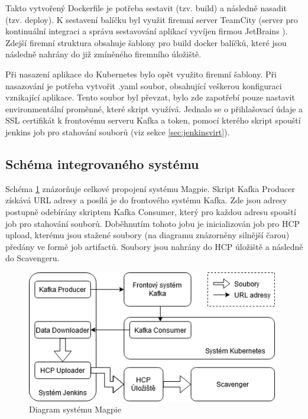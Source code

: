 \documentclass[thesis=M,czech,hidelinks]{FITthesis}[2013/05/06]
\begin{document}
Takto vytvořený Dockerfile je potřeba sestavit (tzv. build) a následně nasadit (tzv. deploy). K sestavení balíčku byl využit firemní server TeamCity (server pro kontinuální integraci a správu sestavování aplikací vyvíjen firmou JetBrains \cite{teamcity}). Zdejší firemní struktura obsahuje šablony pro build docker balíčků, které jsou následně nahrány do již zmíněného firemního úložiště.

Při nasazení aplikace do Kubernetes bylo opět využito firemní šablony. Při nasazování je potřeba vytvořit .yaml soubor, obsahující veškerou konfiguraci vznikající aplikace. Tento soubor byl převzat, bylo zde zapotřebí pouze nastavit environmentální proměnné, které skript využívá. Jednalo se o přihlašovací údaje a SSL certifikát k frontovému serveru Kafka a token, pomocí kterého skript spouští jenkins job pro stahování souborů (viz sekce \ref{sec:jenkinsvirt}).


\subsection{Schéma integrovaného systému}

Schéma \ref{fig:schema} znázorňuje celkové propojení systému Magpie. Skript Kafka Producer získává URL adresy a posílá je do frontového systému Kafka. Zde jsou adresy postupně odebírány skriptem Kafka Consumer, který pro každou adresu spouští job pro stahování souborů. Doběhnutím tohoto jobu je inicializován job pro HCP upload, kterému jsou stažené soubory (na diagramu znázorněny silnější čarou) předány ve formě job artifactů. Soubory jsou nahrány do HCP úložiště a následně do Scavengeru.

\begin{figure}[h]
	\centering
	\includegraphics[width=11cm]{pictures/project_diagram.png}
	\caption{Diagram systému Magpie}
	\label{fig:schema}
\end{figure}
\end{document}
